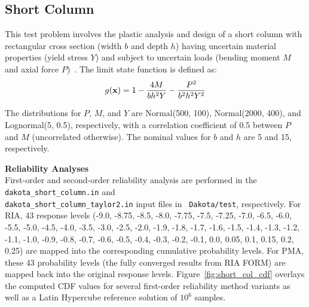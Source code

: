 \subsection{Short Column}\label{additional:short_column}

This test problem involves the plastic analysis and design of a short
column with rectangular cross section (width $b$ and depth $h$) having
uncertain material properties (yield stress $Y$) and subject to
uncertain loads (bending moment $M$ and axial force $P$)~\cite{Kus97}.
The limit state function is defined as:
\begin{equation}
g({\bf x}) = 1 - \frac{4M}{b h^2 Y} - \frac{P^2}{b^2 h^2 Y^2}
\end{equation}

The distributions for $P$, $M$, and $Y$ are Normal(500, 100),
Normal(2000, 400), and Lognormal(5, 0.5), respectively, with a
correlation coefficient of 0.5 between $P$ and $M$ (uncorrelated
otherwise). The nominal values for $b$ and $h$ are 5 and 15,
respectively.

{\bf Reliability Analyses} \\

First-order and second-order reliability analysis are performed in the
\texttt{dakota\_short\_column.in} and \\
\texttt{dakota\_short\_column\_taylor2.in} input files in {\tt
Dakota/test}, respectively. For RIA, 43 response levels (-9.0, -8.75,
-8.5, -8.0, -7.75, -7.5, -7.25, -7.0, -6.5, -6.0, -5.5, -5.0, -4.5,
-4.0, -3.5, -3.0, -2.5, -2.0, -1.9, -1.8, -1.7, -1.6, -1.5, -1.4,
-1.3, -1.2, -1.1, -1.0, -0.9, -0.8, -0.7, -0.6, -0.5, -0.4, -0.3,
-0.2, -0.1, 0.0, 0.05, 0.1, 0.15, 0.2, 0.25) are mapped into the
corresponding cumulative probability levels. For PMA, these 43
probability levels (the fully converged results from RIA FORM) are
mapped back into the original response levels.
Figure~\ref{fig:short_col_cdf} overlays the computed CDF values for
several first-order reliability method variants as well as a Latin
Hypercube reference solution of $10^6$ samples.

